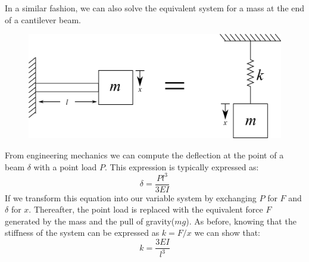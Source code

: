 \documentclass[12pt,letter]{article}
\numberwithin{ex}{section} %
\numberwithin{re}{section} %
\numberwithin{vcs}{section} %
\begin{document}
			In a similar fashion, we can also solve the equivalent system for a mass at the end of a cantilever beam.
			\begin{figure}[H]
				\centering
				\includegraphics[]{../figures/spring_and_bar_mass_cantilever_beam.png}
			\end{figure}			
			From engineering mechanics we can compute the deflection at the point of a beam $\delta$ with a point load $P$. This expression is typically expressed as:
			\begin{equation}
				\delta = \frac{Pl^3}{3EI}
			\end{equation}					
			If we transform this equation into our variable system by exchanging $P$ for $F$ and $\delta$ for $x$. Thereafter, the point load is replaced with the equivalent force $F$ generated by the mass and the pull of gravity($mg$). As before, knowing that the stiffness of the system can be expressed as $k=F/x$ we can show that:
			\begin{equation}
				k = \frac{3EI}{l^3}
			\end{equation}	
\end{document}
